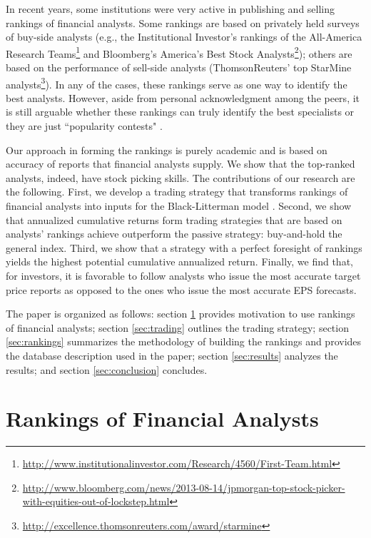 \documentclass{article}\usepackage[]{graphicx}\usepackage[]{color}
\begin{document}
In recent years, some institutions were very active in publishing and  selling  rankings of financial analysts. Some rankings  are based on privately held surveys of  buy-side analysts (e.g., the Institutional Investor's rankings of the All-America Research Teams\footnote{\url{http://www.institutionalinvestor.com/Research/4560/First-Team.html}} and Bloomberg's America's Best Stock Analysts\footnote{\url{http://www.bloomberg.com/news/2013-08-14/jpmorgan-top-stock-picker-with-equities-out-of-lockstep.html}}); others are based on the performance of sell-side analysts (ThomsonReuters' top StarMine analysts\footnote{\url{http://excellence.thomsonreuters.com/award/starmine}}). In any of the cases, these rankings serve as one way to identify the best analysts. However, aside from personal acknowledgment among the peers, it is still arguable whether these rankings can truly identify the best specialists \citep{desai2000ass} or they are just  ``popularity contests" \citep{emery2009}. %


Our approach in forming the rankings is purely academic and is based on  accuracy of reports that financial analysts supply. We show that the top-ranked analysts, indeed, have stock picking skills. The contributions of our research are the following. First, we develop a trading strategy that transforms rankings of financial analysts into inputs for the Black-Litterman model \citep{black1992}. Second, we show that annualized cumulative returns form trading strategies that are  based on analysts' rankings achieve outperform the passive strategy: buy-and-hold the general index. Third, we show that a strategy with a perfect foresight of rankings yields the highest potential cumulative annualized return. Finally, we find that, for investors, it is favorable to follow analysts who issue the most accurate target price reports as opposed to the ones who issue the most accurate EPS forecasts.



The paper is organized as follows: section \ref{sec:ranking} provides motivation to use rankings of financial analysts; section \ref{sec:trading} outlines the trading strategy; section \ref{sec:rankings} summarizes the methodology of building the rankings and provides the database description used in the paper; section \ref{sec:results} analyzes the results; and section \ref{sec:conclusion} concludes.

\section{Rankings of Financial  Analysts}
\label{sec:ranking}
\end{document}
